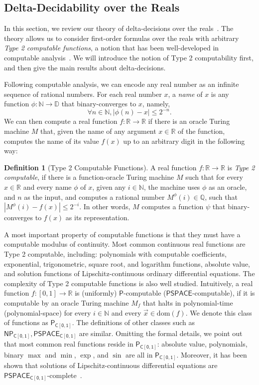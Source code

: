 \documentclass[11pt]{article}
\theoremstyle{definition}
\newtheorem{definition}{Definition}[section]
\newcommand{\N}{\mathbb{N}}
\newcommand{\dom}{\mathrm{dom}}
\newcommand{\R}{\mathbb{R}}
\begin{document}
\subsection{Delta-Decidability over the Reals}\label{delta-decide}

In this section, we review our theory of delta-decisions over the reals~\cite{DBLP:conf/lics/GaoAC12}. The theory allows us to consider first-order formulas over the reals with arbitrary {\em Type 2 computable functions}, a notion that has been well-developed in computable analysis~\cite{CAbook,Kobook}. We will introduce the notion of Type 2 computability first, and then give the main results about delta-decisions. 

Following computable analysis, we can encode any real number as an infinite sequence of rational numbers. For each real number $x$, a {\em name} of $x$ is any function $\phi: \N\rightarrow \mathbb{D}$ that {binary-converges} to $x$, namely, 
$$\forall n\in \N, |\phi(n) - x|\leq 2^{-n}.$$
We can then compute a real function $f:\mathbb{R}\rightarrow\mathbb{R}$ if there is an oracle Turing machine $M$ that, given the name of any argument $x\in\mathbb{R}$ of the function, computes the name of its value $f(x)$ up to an arbitrary digit in the following way:
\begin{definition}[Type 2 Computable Functions]
A real function $f: \R\rightarrow \R$
is {\em Type 2 computable}, if there is a function-oracle Turing machine $M$ such that for every $x\in \mathbb{R}$ and every name $\phi$ of $x$, given any $i\in\mathbb{N}$, the machine uses $\phi$ as an oracle, and $n$ as the input, and computes a rational number $M^{\phi}(i)\in\mathbb{Q}$, such that $|M^{\phi}(i)-f(x)|\leq 2^{-i}$. In other words, $M$ computes a function $\psi$ that binary-converges to $f(x)$ as its representation. 
\end{definition}
A most important property of computable functions is that they must have a computable modulus of continuity. Most common continuous real functions are Type 2 computable, including: polynomials with computable coefficients, exponential, trigonometric, square root, and logarithm functions, absolute value, and solution functions of Lipschitz-continuous ordinary differential equations. The complexity of Type 2 computable functions is also well studied. Intuitively, a real function $f:[0,1]\rightarrow\mathbb{R}$ is (uniformly) $\mathsf{P}$-computable ($\mathsf{PSPACE}$-computable), if it is computable by an oracle Turing machine $M_{f}$ that halts in polynomial-time (polynomial-space) for every $i\in \mathbb{N}$ and every $\vec x\in \dom(f)$. We denote this class of functions as $\mathsf{P_{C[0,1]}}$. The definitions of other classes such as $\mathsf{NP_{C[0,1]}}, \mathsf{PSPACE_{C[0,1]}}$ are similar. Omitting the formal details, we point out that most common real functions reside in $\mathsf{P_{C[0,1]}}$: absolute value, polynomials, binary $\max$ and $\min$, $\exp$, and $\sin$ are all in $\mathsf{P_{C[0,1]}}$. Moreover, it has been shown that solutions of Lipschitz-continuous differential equations are $\mathsf{PSPACE_{C[0,1]}}$-complete~\cite{DBLP:journals/cc/Kawamura10,Kobook}.
\end{document}
